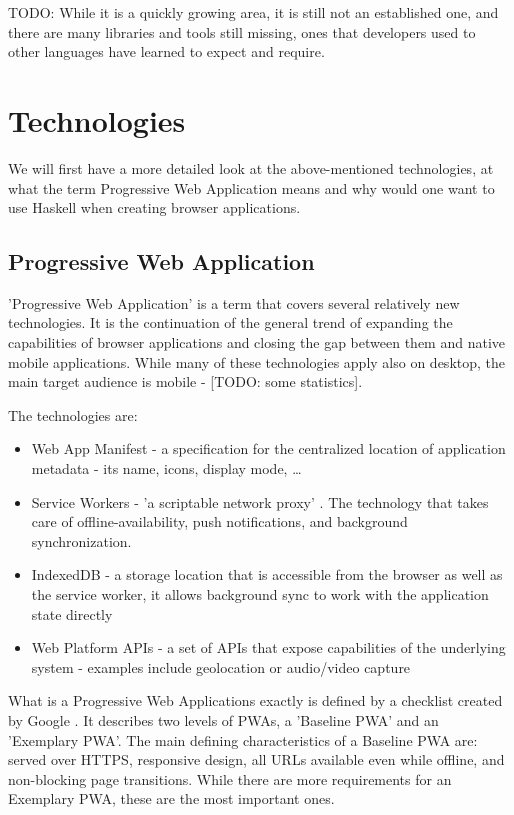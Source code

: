 \documentclass[english,odsaz]{fitthesis}
\begin{document}
TODO: While it is a quickly growing area, it is still not an established one,
and there are many libraries and tools still missing, ones that developers used
to other languages have learned to expect and require.

\chapter{Technologies}
\label{sec:orgbd63bbb}
We will first have a more detailed look at the above-mentioned technologies, at
what the term Progressive Web Application means and why would one want to use
Haskell when creating browser applications.

\section{Progressive Web Application}
\label{sec:org3d8a25f}
'Progressive Web Application' is a term that covers several relatively new
technologies. It is the continuation of the general trend of expanding the
capabilities of browser applications and closing the gap between them and native
mobile applications. While many of these technologies apply also on desktop, the
main target audience is mobile - [TODO: some statistics].

The technologies are:
\begin{itemize}
\item Web App Manifest - a specification for the centralized location of application
metadata - its name, icons, display mode, \ldots{}
\item Service Workers - 'a scriptable network proxy' \cite{mdn_svcwrk}. The
technology that takes care of offline-availability, push notifications, and
background synchronization.
\item IndexedDB - a storage location that is accessible from the browser as well as
the service worker, it allows background sync to work with the application
state directly
\item Web Platform APIs - a set of APIs that expose capabilities of the underlying
system - examples include geolocation or
audio/video capture \cite{what_web_can_do}
\end{itemize}

What is a Progressive Web Applications exactly is defined by a checklist created
by Google \cite{pwa_checklist}. It describes two levels of PWAs, a 'Baseline PWA'
and an 'Exemplary PWA'. The main defining characteristics of a Baseline PWA are:
served over HTTPS, responsive design, all URLs available even while offline, and
non-blocking page transitions. While there are more requirements for an
Exemplary PWA, these are the most important ones.
\end{document}
